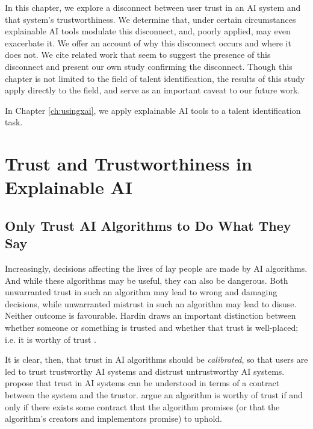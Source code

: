 In this chapter, we explore a disconnect between user trust in an AI system and that system's trustworthiness. We determine that, under certain circumstances explainable AI tools modulate this disconnect, and, poorly applied, may even exacerbate it. We offer an account of why this disconnect occurs and where it does not. We cite related work that seem to suggest the presence of this disconnect and present our own study confirming the disconnect. Though this chapter is not limited to the field of talent identification, the results of this study apply directly to the field, and serve as an important caveat to our future work.

In Chapter \ref{ch:usingxai}, we apply explainable AI tools to a talent identification task.

\section{Trust and Trustworthiness in Explainable AI}
\subsection{Only Trust AI Algorithms to Do What They Say} 
Increasingly, decisions affecting the lives of lay people are made by AI algorithms. And while these algorithms may be useful, they can also be dangerous. Both unwarranted trust in such an algorithm may lead to wrong and damaging decisions, while unwarranted mistrust in such an algorithm may lead to disuse. Neither outcome is favourable. Hardin draws an important distinction between whether someone or something is trusted and whether that trust is well-placed; i.e. it is worthy of trust \cite{hardin_trust_2002}. 

It is clear, then, that trust in AI algorithms should be \textit{calibrated}, so that users are led to trust trustworthy AI systems and distrust untrustworthy AI systems. \textcite{jacovi_formalizing_2021} propose that trust in AI systems can be understood in terms of a contract between the system and the trustor. \textcite{jacovi_formalizing_2021} argue an algorithm is worthy of trust if and only if there exists some contract that the algorithm promises (or that the algorithm's creators and implementors promise) to uphold.

